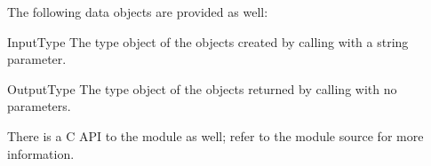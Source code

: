 The following data objects are provided as well:


\begin{datadesc}{InputType}
  The type object of the objects created by calling
   with a string parameter.
\end{datadesc}

\begin{datadesc}{OutputType}
  The type object of the objects returned by calling
   with no parameters.
\end{datadesc}


There is a C API to the module as well; refer to the module source for 
more information.
